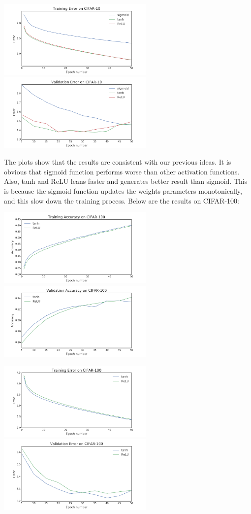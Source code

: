 \documentclass[]{article}
\begin{document}
\includegraphics[width=3in]{activation_function_train_err}
\includegraphics[width=3in]{activation_function_valid_err}

The plots show that the results are consistent with our previous ideas. It is obvious that sigmoid function performs worse than other activation functions. Also, tanh and ReLU leans faster and generates better result than sigmoid. This is because the sigmoid function updates the weights parameters monotonically, and this slow down the training process.
Below are the results on CIFAR-100:

\includegraphics[width=3in]{activation_function_train100_acc}
\includegraphics[width=3in]{activation_function_valid100_acc}

\includegraphics[width=3in]{activation_function_train100_err}
\includegraphics[width=3in]{activation_function_valid100_err}
\end{document}
